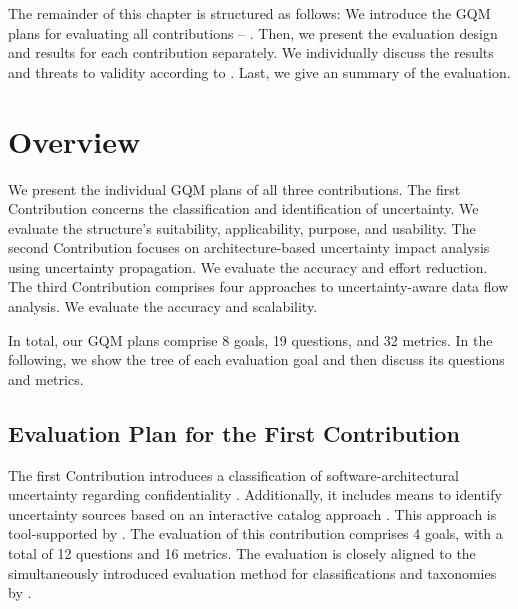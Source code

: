 The remainder of this chapter is structured as follows:
We introduce the \ac{GQM} plans for evaluating all contributions  -- .
Then, we present the evaluation design and results for each contribution separately.
We individually discuss the results and threats to validity according to \textcite{runeson_guidelines_2009}.
Last, we give an summary of the evaluation.






\section{Overview}%
\label{sec:evaluation:overview}

We present the individual \ac{GQM} plans of all three contributions.
The first Contribution  concerns the classification and identification of uncertainty.
We evaluate the structure's suitability, applicability, purpose, and usability.
The second Contribution  focuses on architecture-based uncertainty impact analysis using uncertainty propagation.
We evaluate the accuracy and effort reduction.
The third Contribution  comprises four approaches to uncertainty-aware data flow analysis.
We evaluate the accuracy and scalability.

In total, our \ac{GQM} plans comprise 8 goals, 19 questions, and 32 metrics.
In the following, we show the tree of each evaluation goal and then discuss its questions and metrics.


\subsection{Evaluation Plan for the First Contribution}

The first Contribution  introduces a classification of software-architectural uncertainty regarding confidentiality \cite{hahner_classification_2023}.
Additionally, it includes means to identify uncertainty sources based on an interactive catalog approach \cite{hahner_arcn_2024}.
This approach is tool-supported by \arcen.
The evaluation of this contribution comprises 4 goals, with a total of 12 questions and 16 metrics.
The evaluation is closely aligned to the simultaneously introduced evaluation method for classifications and taxonomies by \textcite{kaplan_introducing_2022}.

